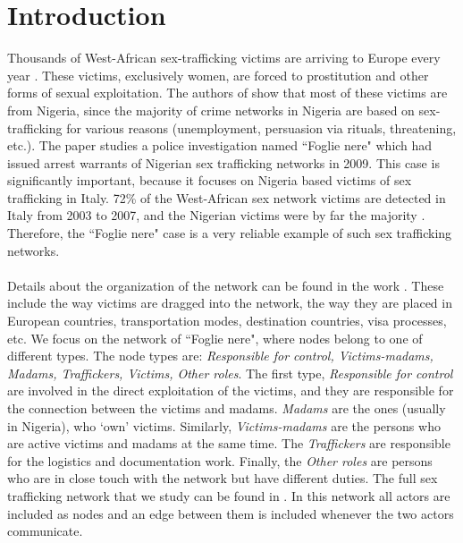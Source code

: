 \documentclass[10p]{article}
\theoremstyle{definition}
\theoremstyle{definition}
\begin{document}
\section{Introduction}
Thousands of West-African sex-trafficking victims are arriving to Europe every year \cite{morselli2009inside}. These victims, exclusively women, are forced to prostitution and other forms of sexual exploitation. The authors of \cite{olagbegi2006human} show that most of these victims are from Nigeria, since the majority of crime networks in Nigeria are based on sex-trafficking for various reasons (unemployment, persuasion via rituals, threatening, etc.). The paper \cite{mancuso2014not} studies a police investigation named ``Foglie nere" which had issued arrest warrants of Nigerian sex trafficking networks in 2009. This case is significantly important, because it focuses on Nigeria based victims of sex trafficking in Italy. 72\% of the West-African sex network victims are detected in Italy from 2003 to 2007, and the Nigerian victims were by far the majority \cite{morselli2009inside}. Therefore, the ``Foglie nere" case is a very reliable example of such sex trafficking networks. \\  \\
Details about the organization of the network can be found in the work \cite{mancuso2014not}. These include the way victims are dragged into the network, the way they are placed in European countries, transportation modes, destination countries, visa processes, etc. We focus on the network of ``Foglie nere", where nodes belong to one of different types. The node types are: \textit{Responsible for control, Victims-madams, Madams, Traffickers, Victims, Other roles}. The first type, \textit{Responsible for control} are involved in the direct exploitation of the victims, and they are responsible for the connection between the victims and madams. \textit{Madams} are the ones (usually in Nigeria), who `own' victims. Similarly, \textit{Victims-madams} are the persons who are active victims and madams at the same time. The \textit{Traffickers} are responsible for the logistics and documentation work. Finally, the \textit{Other roles} are persons who are in close touch with the network but have different duties. The full sex trafficking network that we study can be found in \cite{mancuso2014not}. In this network all actors are included as nodes and an edge between them is included whenever the two actors communicate.
\end{document}

